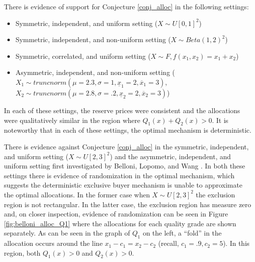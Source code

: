 \documentclass{article}
\newcounter{fig}
\begin{document}
There is evidence of support for Conjecture \ref{conj_alloc} in the following settings:
\begin{itemize}
    \item Symmetric, independent, and uniform setting ($X \sim U[0,1]^2$)
    \item Symmetric, independent, and non-uniform setting ($X \sim Beta(1,2)^2$)
    \item Symmetric, correlated, and uniform setting ($X \sim F, f(x_1,x_2) = x_1 + x_2$)
    \item Asymmetric, independent, and non-uniform setting ($X_1 \sim truncnorm(\mu=2.3, \sigma=1, \underline{x}_1=2, \overline{x}_1=3)$, $X_2 \sim truncnorm(\mu=2.8, \sigma=.2, \underline{x}_2=2, \overline{x}_2=3)$)
\end{itemize}
\noindent In each of these settings, the reserve prices were consistent and the allocations were qualitatively similar in the region where $Q_1(x) + Q_2(x) > 0$. It is noteworthy that in each of these settings, the optimal mechanism is deterministic. 

There is evidence against Conjecture \ref{conj_alloc} in the symmetric, independent, and uniform setting ($X \sim U[2,3]^2$) and the asymmetric, independent, and uniform setting first investigated by Belloni, Lopomo, and Wang \autocite*{belloni2010multidimensional}. In both these settings there is evidence of randomization in the optimal mechanism, which suggests the deterministic exclusive buyer mechanism is unable to approximate the optimal allocations. In the former case when $X \sim U[2,3]^2$ the exclusion region is not rectangular. In the latter case, the exclusion region has measure zero and, on closer inspection, evidence of randomization can be seen in Figure \ref{fig:belloni_alloc_Q1} where the allocations for each quality grade are shown separately. As can be seen in the graph of $Q_1$ on the left, a ``fold'' in the allocation occurs around the line $x_1 - c_1 = x_2 - c_2$ (recall, $c_1=.9, c_2=5$). In this region, both $Q_1(x) > 0$ and $Q_2(x) > 0$.
\end{document}
